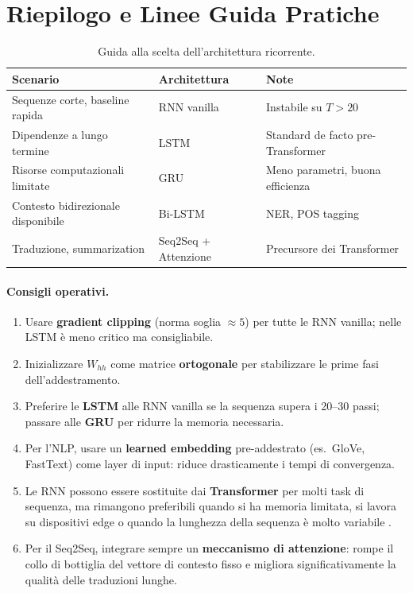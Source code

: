 \section{Riepilogo e Linee Guida Pratiche}
\label{sec:rnn-summary}

\begin{table}[H]
  \centering
  \caption{Guida alla scelta dell'architettura ricorrente.}
  \label{tab:rnn_guide}
  \small
  \begin{tabular}{lll}
    \toprule
    \textbf{Scenario} & \textbf{Architettura} & \textbf{Note} \\
    \midrule
    Sequenze corte, baseline rapida & RNN vanilla & Instabile su $T > 20$ \\
    Dipendenze a lungo termine & LSTM & Standard de facto pre-Transformer \\
    Risorse computazionali limitate & GRU & Meno parametri, buona efficienza \\
    Contesto bidirezionale disponibile & Bi-LSTM & NER, POS tagging \\
    Traduzione, summarization & Seq2Seq + Attenzione & Precursore dei Transformer \\
    \bottomrule
  \end{tabular}
\end{table}

\paragraph{Consigli operativi.}
\begin{enumerate}
  \item Usare \textbf{gradient clipping} (norma soglia $\approx 5$) per tutte
        le RNN vanilla; nelle LSTM è meno critico ma consigliabile.
  \item Inizializzare $W_{hh}$ come matrice \textbf{ortogonale} per stabilizzare
        le prime fasi dell'addestramento.
  \item Preferire le \textbf{LSTM} alle RNN vanilla se la sequenza supera i 20--30
        passi; passare alle \textbf{GRU} per ridurre la memoria necessaria.
  \item Per l'NLP, usare un \textbf{learned embedding} pre-addestrato (es.\
        GloVe, FastText) come layer di input: riduce drasticamente i tempi di
        convergenza.
  \item Le RNN possono essere sostituite dai \textbf{Transformer} per molti task
        di sequenza, ma rimangono preferibili quando si ha memoria limitata, si
        lavora su dispositivi edge o quando la lunghezza della sequenza è molto
        variabile \citep{bishop2024}.
  \item Per il Seq2Seq, integrare sempre un \textbf{meccanismo di attenzione}:
        rompe il collo di bottiglia del vettore di contesto fisso e migliora
        significativamente la qualità delle traduzioni lunghe.
\end{enumerate}
